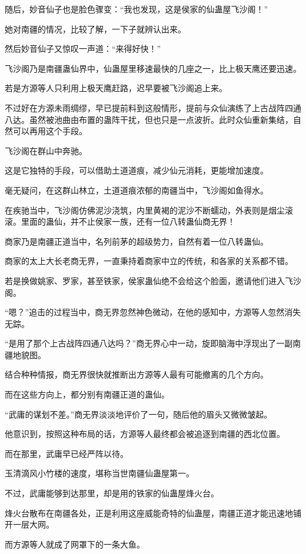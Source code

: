 \begin{this_body}
随后，妙音仙子也是脸色骤变：“我也发现，这是侯家的仙蛊屋飞沙阁！”

她对南疆的情况，比较了解，一下子就辨认出来。

然后妙音仙子又惊叹一声道：“来得好快！”

飞沙阁乃是南疆蛊仙界中，仙蛊屋里移速最快的几座之一，比上极天鹰还要迅速。

若是方源等人只利用上极天鹰赶路，迟早要被飞沙阁追上来。

不过好在方源未雨绸缪，早已提前料到这般情形，提前与众仙演练了上古战阵四通八达。虽然被池曲由布置的蛊阵干扰，但也只是一点波折。此时众仙重新集结，自然可以再用这个手段。

飞沙阁在群山中奔驰。

这是它独特的手段，可以借助土道道痕，减少仙元消耗，更能增加速度。

毫无疑问，在这群山林立，土道道痕浓郁的南疆当中，飞沙阁如鱼得水。

在疾驰当中，飞沙阁仿佛泥沙浇筑，内里黄褐的泥沙不断蠕动，外表则是烟尘滚滚。里面的蛊仙，并不止侯家一族，还有一位八转蛊仙商无界！

商家乃是南疆正道当中，名列前茅的超级势力，自然有着一位八转蛊仙。

商家的太上大长老商无界，一直秉持着商家中立的传统，和各家的关系都不错。

若是换做姚家、罗家，甚至铁家，侯家蛊仙绝不会给这个脸面，邀请他们进入飞沙阁。

“嗯？”追击的过程当中，商无界忽然神色微动，在他的感知中，方源等人忽然消失无踪。

“是用了那个上古战阵四通八达吗？”商无界心中一动，旋即脑海中浮现出了一副南疆地貌图。

结合种种情报，商无界很快就推断出方源等人最有可能撤离的几个方向。

而在这些方向上，都分别有南疆正道的蛊仙。

“武庸的谋划不差。”商无界淡淡地评价了一句，随后他的眉头又微微皱起。

他意识到，按照这种布局的话，方源等人最终都会被追逐到南疆的西北位置。

而在那里，武庸早已经严阵以待。

玉清滴风小竹楼的速度，堪称当世南疆仙蛊屋第一。

不过，武庸能够到达那里，却是用的铁家的仙蛊屋烽火台。

烽火台散布在南疆各处，正是利用这座威能奇特的仙蛊屋，南疆正道才能迅速地铺开一层大网。

而方源等人就成了网罩下的一条大鱼。


\end{this_body}
